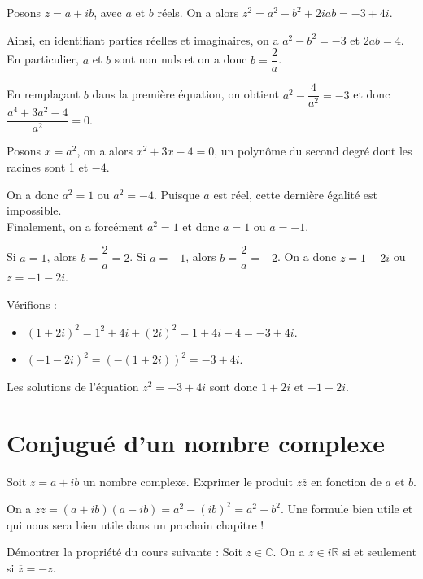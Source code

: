 \documentclass[11pt,fleqn, openany]{book} %
\begin{document}
\begin{solution}Posons $z=a+ib$, avec $a$ et $b$ réels. On a alors $z^2=a^2-b^2+2iab=-3+4i$.

Ainsi, en identifiant parties réelles et imaginaires, on a $a^2-b^2=-3$ et $2ab=4$.\\ En particulier, $a$ et $b$ sont non nuls et on a donc $b=\dfrac{2}{a}$.

En remplaçant $b$ dans la première équation, on obtient $a^2-\dfrac{4}{a^2}=-3$ et donc $\dfrac{a^4+3a^2-4}{a^2}=0$.

Posons $x=a^2$, on a alors $x^2+3x-4=0$, un polynôme du second degré dont les racines sont 1 et $-4$.

On a donc $a^2=1$ ou $a^2=-4$. Puisque $a$ est réel, cette dernière égalité est impossible.\\ Finalement, on a forcément $a^2=1$ et donc $a=1$ ou $a=-1$.

Si $a=1$, alors $b=\dfrac{2}{a}=2$. Si $a=-1$, alors $b=\dfrac{2}{a}=-2$. On a donc $z=1+2i$ ou $z=-1-2i$.

Vérifions :
\begin{itemize}
\item $(1+2i)^2=1^2+4i+(2i)^2=1+4i-4=-3+4i$.
\item $(-1-2i)^2=(-(1+2i))^2=-3+4i$.
\end{itemize}
Les solutions de l'équation $z^2=-3+4i$ sont donc $1+2i$ et $-1-2i$.
\end{solution}

\section*{Conjugué d'un nombre complexe}



\begin{exercise}[topic=cpx02]Soit $z=a+ib$ un nombre complexe. Exprimer le produit $z\overline{z}$ en fonction de $a$ et $b$. \end{exercise}

\begin{solution}On a \(z\overline{z}=(a+ib)(a-ib)=a^2-(ib)^2=a^2+b^2\). Une formule bien utile et qui nous sera bien utile dans un prochain chapitre !\end{solution}

\begin{exercise}[topic=cpx02]Démontrer la propriété du cours suivante : Soit $z\in\mathbb{C}$. On a $z\in i\mathbb{R}$ si et seulement si $\overline{z}=-z$.\end{exercise}
\end{document}
